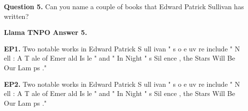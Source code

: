 \begin{mdframed}\small
\textbf{Question 5.}
 Can you name a couple of books that Edward Patrick Sullivan has written? 
\end{mdframed}

\begin{mdframed}\small
\textbf{Llama TNPO Answer 5.}

\textbf{EP1.} \textcolor{Gray3}{Two} \textcolor{Gray5}{notable} \textcolor{Gray8}{works} \textcolor{Gray9}{in} \textcolor{Gray9}{Edward} \textcolor{Gray9}{Patrick} \textcolor{Gray9}{S} \textcolor{Gray9}{ull} \textcolor{Gray9}{ivan} \textcolor{Gray8}{"} \textcolor{Gray6}{s} \textcolor{Gray6}{o} \textcolor{Gray9}{e} \textcolor{Gray7}{uv} \textcolor{Gray9}{re} \textcolor{Gray9}{include} \textcolor{Gray8}{"} \textcolor{Gray7}{N} \textcolor{Gray9}{ell} \textcolor{Gray8}{:} \textcolor{Gray9}{A} \textcolor{Gray7}{T} \textcolor{Gray9}{ale} \textcolor{Gray9}{of} \textcolor{Gray6}{Emer} \textcolor{Gray9}{ald} \textcolor{Gray8}{Is} \textcolor{Gray9}{le} \textcolor{Gray9}{"} \textcolor{Gray9}{and} \textcolor{Gray9}{"} \textcolor{Gray9}{In} \textcolor{Gray9}{Night} \textcolor{Gray9}{"} \textcolor{Gray9}{s} \textcolor{Gray9}{Sil} \textcolor{Gray8}{ence} \textcolor{Gray9}{,} \textcolor{Gray9}{the} \textcolor{Gray7}{Stars} \textcolor{Gray9}{Will} \textcolor{Gray9}{Be} \textcolor{Gray8}{Our} \textcolor{Gray9}{Lam} \textcolor{Gray9}{ps} \textcolor{Gray7}{."} 

\textbf{EP2.} \textcolor{Gray0}{Two} \textcolor{Gray0}{notable} \textcolor{Gray1}{works} \textcolor{Gray0}{in} \textcolor{Gray0}{Edward} \textcolor{Gray2}{Patrick} \textcolor{Gray4}{S} \textcolor{Gray7}{ull} \textcolor{Gray4}{ivan} \textcolor{Gray1}{"} \textcolor{Gray0}{s} \textcolor{Gray0}{o} \textcolor{Gray2}{e} \textcolor{Gray6}{uv} \textcolor{Gray8}{re} \textcolor{Gray1}{include} \textcolor{Gray0}{"} \textcolor{Gray0}{N} \textcolor{Gray9}{ell} \textcolor{Gray0}{:} \textcolor{Gray1}{A} \textcolor{Gray0}{T} \textcolor{Gray3}{ale} \textcolor{Gray1}{of} \textcolor{Gray1}{Emer} \textcolor{Gray8}{ald} \textcolor{Gray1}{Is} \textcolor{Gray9}{le} \textcolor{Gray2}{"} \textcolor{Gray3}{and} \textcolor{Gray2}{"} \textcolor{Gray0}{In} \textcolor{Gray5}{Night} \textcolor{Gray0}{"} \textcolor{Gray5}{s} \textcolor{Gray7}{Sil} \textcolor{Gray8}{ence} \textcolor{Gray3}{,} \textcolor{Gray4}{the} \textcolor{Gray6}{Stars} \textcolor{Gray7}{Will} \textcolor{Gray6}{Be} \textcolor{Gray4}{Our} \textcolor{Gray9}{Lam} \textcolor{Gray8}{ps} \textcolor{Gray3}{."} 


\end{mdframed}
